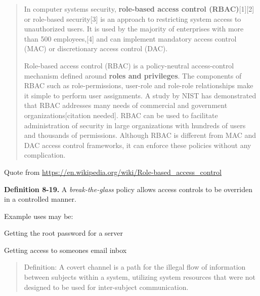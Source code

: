 \documentclass[Screen16to9,17pt]{foils}
\begin{document}

\begin{quote}
In computer systems security, {\bf role-based access control (RBAC)}[1][2] or role-based security[3] is an approach to restricting system access to unauthorized users. It is used by the majority of enterprises with more than 500 employees,[4] and can implement mandatory access control (MAC) or discretionary access control (DAC).

Role-based access control (RBAC) is a policy-neutral access-control mechanism defined around {\bf roles and privileges}. The components of RBAC such as role-permissions, user-role and role-role relationships make it simple to perform user assignments. A study by NIST has demonstrated that RBAC addresses many needs of commercial and government organizations[citation needed]. RBAC can be used to facilitate administration of security in large organizations with hundreds of users and thousands of permissions. Although RBAC is different from MAC and DAC access control frameworks, it can enforce these policies without any complication.
\end{quote}
Quote from \url{https://en.wikipedia.org/wiki/Role-based_access_control}







\begin{list1}
\item {\bf Definition 8-19.} A \emph{break-the-glass} policy allows access controls to be overriden in a controlled manner.
\item Example uses may be:
\item Getting the root password for a server
\item Getting access to someones email inbox
\end{list1}


\begin{quote}
Definition: A covert channel is a path for the illegal flow of
information between subjects within a system, utilizing system
resources that were not designed to be used for inter-subject
communication.
\end{quote}
\end{document}

